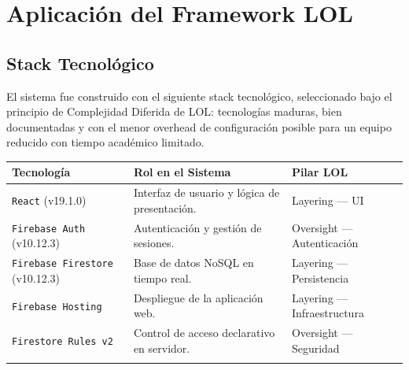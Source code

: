 \documentclass[14pt,a4paper,oneside]{extbook}
\begin{document}
\section{Aplicación del Framework LOL}

\subsection{Stack Tecnológico}

El sistema fue construido con el siguiente stack tecnológico, seleccionado bajo el principio de Complejidad Diferida de LOL: tecnologías maduras, bien documentadas y con el menor overhead de configuración posible para un equipo reducido con tiempo académico limitado.

\begin{table}[htbp]
\centering
\small %
\renewcommand{\arraystretch}{1.4} %

\begin{tabularx}{\textwidth}{
    >{\raggedright\arraybackslash\hsize=0.7\hsize}X %
    >{\raggedright\arraybackslash\hsize=1.3\hsize}X %
    >{\raggedright\arraybackslash\hsize=1.0\hsize}X %
}
\toprule
\textbf{Tecnología} & \textbf{Rol en el Sistema} & \textbf{Pilar LOL} \\
\midrule

\texttt{React} \newline \footnotesize{(v19.1.0)} & 
Interfaz de usuario y lógica de presentación. & 
Layering — UI \\
\addlinespace

\texttt{Firebase Auth} \newline \footnotesize{(v10.12.3)} & 
Autenticación y gestión de sesiones. & 
Oversight — Autenticación \\
\addlinespace

\texttt{Firebase Firestore} \newline \footnotesize{(v10.12.3)} & 
Base de datos NoSQL en tiempo real. & 
Layering — Persistencia \\
\addlinespace

\texttt{Firebase Hosting} & 
Despliegue de la aplicación web. & 
Layering — Infraestructura \\
\addlinespace

\texttt{Firestore Rules v2} & 
Control de acceso declarativo en servidor. & 
Oversight — Seguridad \\
\addlinespace


\end{tabularx}
\end{table}
\end{document}
